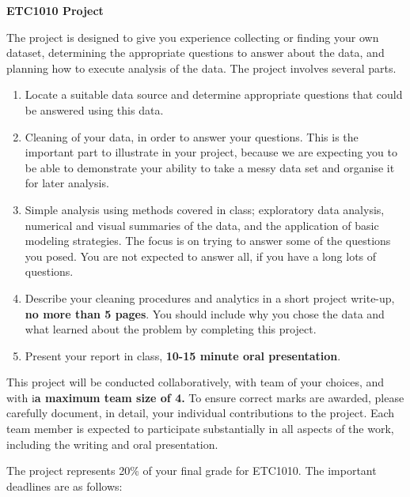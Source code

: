\documentclass{article}
\begin{document}
\centerline{\Large\bf ETC1010 Project}

\large 
\bigskip 
\bigskip The project is designed to give you experience collecting or finding your own dataset, determining the
appropriate questions to answer about the data, and planning how to execute analysis of the data.  The project involves several parts. 

\begin{enumerate} \itemsep 0in
\item Locate a suitable data source and determine appropriate questions that could be answered using this data. 
\item Cleaning of your data, in order to answer your questions. This is the important part to illustrate in your project, because we are expecting you to be able to demonstrate your ability to take a messy data set and organise it for later analysis.
\item Simple analysis using methods covered in class; exploratory data analysis, numerical and visual summaries of the data, and the application of basic modeling strategies. The focus is on trying to answer some of the questions you posed. You are not expected to answer all, if you have a long lots of questions. 
\item Describe your cleaning procedures and analytics in a short project write-up, {\bf no more than 5 pages}. You  should include why you chose the data and what learned about the problem by completing this project.
\item Present your report in class,  \textbf{10-15 minute oral presentation}.
\end{enumerate}

This project will be conducted collaboratively, with team of your choices, and with  i\textbf{a maximum team size of 4.} To ensure correct marks are awarded, please carefully document, in detail, your individual contributions to the project. Each team member is expected to participate substantially in all aspects of the work, including the writing and oral presentation.

\bigskip
The project represents 20\% of your final grade for ETC1010. The important deadlines are as follows: 
\end{document}
